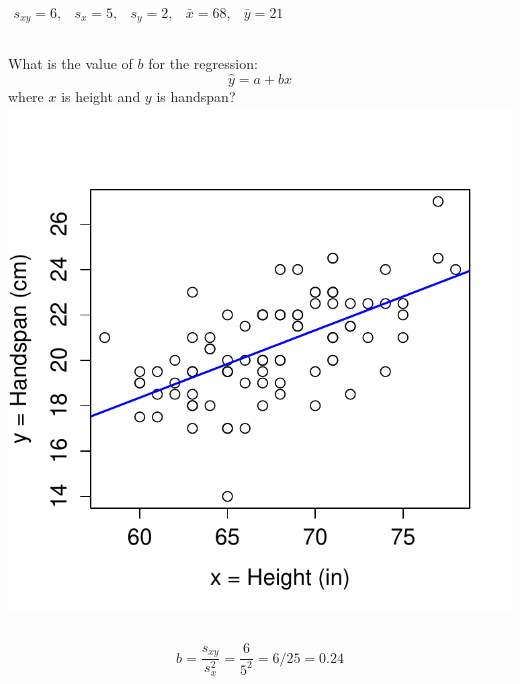 \documentclass[handout]{beamer}
\begin{document}
\begin{frame}
$\begin{array}{ccccc} s_{xy} = 6,&s_x = 5,& s_y = 2,& \bar{x} = 68,& \bar{y} = 21\end{array}$
\begin{columns}[c]
\column{2.5in}
What is the value of $b$ for the regression: $$\hat{y}=a+bx$$
where $x$ is height and $y$ is handspan?
\column{1.8in}
\includegraphics[scale = 0.4]{./images/height_handspan2}
\end{columns}
\alert{$$b = \frac{s_{xy}}{s_x^2} = \frac{6}{5^2} = 6/25 = 0.24 $$}
\end{frame}
\end{document}
